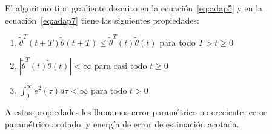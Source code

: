             \begin{lema}
                El algoritmo tipo gradiente descrito en la ecuación~\ref{eq:adap5} y en la ecuación~\ref{eq:adap7} tiene las siguientes propiedades:

                \begin{enumerate}
                    \item $\tilde{\theta}^T(t + T) \tilde{\theta}(t + T) \le \tilde{\theta}^T(t) \tilde{\theta}(t)$ para todo $T > t \ge 0$
                    \item $\left| \tilde{\theta}^T(t) \tilde{\theta}(t) \right| < \infty$ para casi todo $t \ge 0$
                    \item $\int_0^{\infty} e^2(\tau) d\tau < \infty$ para todo $t > 0$
                \end{enumerate}

                A estas propiedades les llamamos error paramétrico no creciente, error paramétrico acotado, y energía de error de estimación acotada.
            \end{lema}

